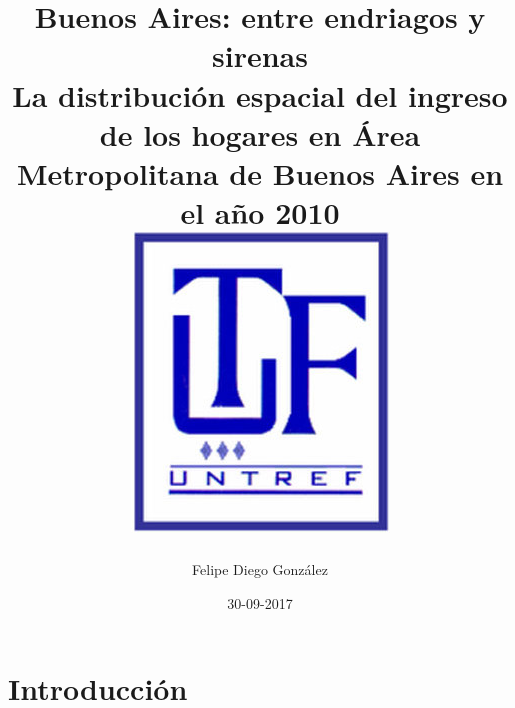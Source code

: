 \documentclass{report}
\title{
	{Buenos Aires: entre endriagos y sirenas}\\
	{\large La distribución espacial del ingreso de los hogares en Área Metropolitana de Buenos Aires en el año 2010}\\
	{\includegraphics{untrefLogo.jpg}}
}
\author{Felipe Diego González}
\date{30-09-2017}
\begin{document}
  	\maketitle
  	
  	\tableofcontents
  	
  	\chapter{Introducción}
  	

	  	
	
  		
  	 
  		
  	  	  
  	
  
\end{document}
